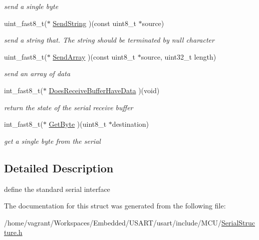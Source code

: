 \begin{DoxyCompactItemize}
\begin{DoxyCompactList}\small\item\em send a single byte \end{DoxyCompactList}\item 
\hypertarget{struct_serial_interface_a2dc11441227e78ac5a281f88f8fab577}{uint\+\_\+fast8\+\_\+t($\ast$ \hyperlink{struct_serial_interface_a2dc11441227e78ac5a281f88f8fab577}{Send\+String} )(const uint8\+\_\+t $\ast$source)}\label{struct_serial_interface_a2dc11441227e78ac5a281f88f8fab577}

\begin{DoxyCompactList}\small\item\em send a string that. The string should be terminated by null character \end{DoxyCompactList}\item 
\hypertarget{struct_serial_interface_a2f49f38e4a372077a2755eb5e7884b35}{uint\+\_\+fast8\+\_\+t($\ast$ \hyperlink{struct_serial_interface_a2f49f38e4a372077a2755eb5e7884b35}{Send\+Array} )(const uint8\+\_\+t $\ast$source, uint32\+\_\+t length)}\label{struct_serial_interface_a2f49f38e4a372077a2755eb5e7884b35}

\begin{DoxyCompactList}\small\item\em send an array of data \end{DoxyCompactList}\item 
\hypertarget{struct_serial_interface_a3c8c5895d4ebeaa8d1bf911c7f5e9dbd}{int\+\_\+fast8\+\_\+t($\ast$ \hyperlink{struct_serial_interface_a3c8c5895d4ebeaa8d1bf911c7f5e9dbd}{Does\+Receive\+Buffer\+Have\+Data} )(void)}\label{struct_serial_interface_a3c8c5895d4ebeaa8d1bf911c7f5e9dbd}

\begin{DoxyCompactList}\small\item\em return the state of the serial receive buffer \end{DoxyCompactList}\item 
\hypertarget{struct_serial_interface_a318df81760d2f0b0fb209fc39594b45e}{int\+\_\+fast8\+\_\+t($\ast$ \hyperlink{struct_serial_interface_a318df81760d2f0b0fb209fc39594b45e}{Get\+Byte} )(uint8\+\_\+t $\ast$destination)}\label{struct_serial_interface_a318df81760d2f0b0fb209fc39594b45e}

\begin{DoxyCompactList}\small\item\em get a single byte from the serial \end{DoxyCompactList}\end{DoxyCompactItemize}


\subsection{Detailed Description}
define the standard serial interface 

The documentation for this struct was generated from the following file\+:\begin{DoxyCompactItemize}
\item 
/home/vagrant/\+Workspaces/\+Embedded/\+U\+S\+A\+R\+T/usart/include/\+M\+C\+U/\hyperlink{_serial_structure_8h}{Serial\+Structure.\+h}\end{DoxyCompactItemize}
